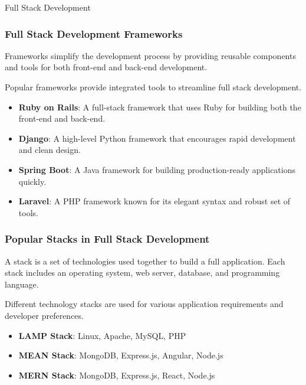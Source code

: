\begin{notes}{Full Stack Development}
    \subsubsection*{Full Stack Development Frameworks}
    
    Frameworks simplify the development process by providing reusable components and tools for both front-end and back-end development.
    
    \begin{highlight}
    
        Popular frameworks provide integrated tools to streamline full stack development.
        
        \begin{itemize}
            \item \textbf{Ruby on Rails}: A full-stack framework that uses Ruby for building both the front-end and back-end.
            \item \textbf{Django}: A high-level Python framework that encourages rapid development and clean design.
            \item \textbf{Spring Boot}: A Java framework for building production-ready applications quickly.
            \item \textbf{Laravel}: A PHP framework known for its elegant syntax and robust set of tools.
        \end{itemize}
    
    \end{highlight}
    
    \subsubsection*{Popular Stacks in Full Stack Development}
    
    A stack is a set of technologies used together to build a full application. Each stack includes an operating system, web server, database, and programming language.
    
    \begin{highlight}
    
        Different technology stacks are used for various application requirements and developer preferences.
        
        \begin{itemize}
            \item \textbf{LAMP Stack}: Linux, Apache, MySQL, PHP
            \item \textbf{MEAN Stack}: MongoDB, Express.js, Angular, Node.js
            \item \textbf{MERN Stack}: MongoDB, Express.js, React, Node.js
        \end{itemize}
    

\end{highlight}
\end{notes}
